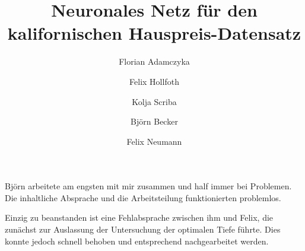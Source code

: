 \documentclass[9pt,a4paper,twocolumn,twoside]{tau-class/tau}
\begin{document}
Björn arbeitete am engsten mit mir zusammen und half immer bei Problemen. Die inhaltliche Absprache und die Arbeitsteilung funktionierten problemlos. 

Einzig zu beanstanden ist eine Fehlabsprache zwischen ihm und Felix, die zunächst zur Auslassung der Untersuchung der optimalen Tiefe führte. Dies konnte jedoch schnell behoben und entsprechend nachgearbeitet werden.
\newpage



\title{Neuronales Netz f\"ur den kalifornischen Hauspreis-Datensatz}



\author[a]{Florian Adamczyka}%
\author[b]{Felix Hollfoth}
\author[c]{Kolja Scriba}
\author[d]{Björn Becker}
\author[e]{Felix Neumann}





\theday{\today}

\end{document}
